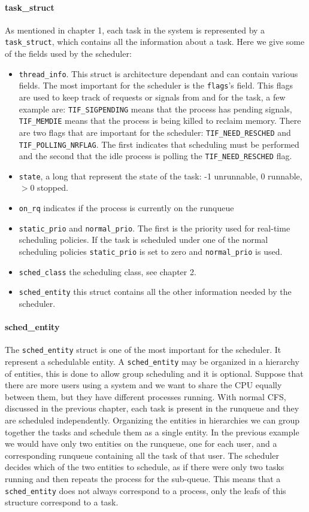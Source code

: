 \documentclass[10pt]{book}
\begin{document}
\paragraph{task\_struct}
As mentioned in chapter 1, each task in the system is represented by a \newline \verb|task_struct|, which contains all the information about a task. Here we give some of the fields used by the scheduler:
\begin{itemize}
    \item \verb|thread_info|. This struct is architecture dependant and can contain various fields. The most important for the scheduler is the \verb|flags|'s field. This flags are used to keep track of requests or signals from and for the task, a few example are: \verb|TIF_SIGPENDING| means that the process has pending signals, \verb|TIF_MEMDIE| means that the process is being killed to reclaim memory. There are two flags that are important for the scheduler: \verb|TIF_NEED_RESCHED| and \verb|TIF_POLLING_NRFLAG|. The first indicates that scheduling must be performed and the second that the idle process is polling the \verb|TIF_NEED_RESCHED| flag. %
    \item \verb|state|, a long that represent the state of the task: -1 unrunnable, 0 runnable, $>0$ stopped. 
    \item \verb|on_rq| indicates if the process is currently on the runqueue
    \item \verb|static_prio| and \verb|normal_prio|. The first is the priority used for real-time scheduling policies. If the task is scheduled under one of the normal scheduling policies \verb|static_prio| is set to zero and \verb|normal_prio| is used.
    \item \verb|sched_class| the scheduling class, see chapter 2.
    \item \verb|sched_entity| this struct contains all the other information needed by the scheduler.
\end{itemize}

\paragraph{sched\_entity}
The \verb|sched_entity| struct is one of the most important for the scheduler. It represent a schedulable entity.
A \verb|sched_entity| may be organized in a hierarchy of entities, this is done to allow group scheduling and it is optional. Suppose that there are more users using a system and we want to share the CPU equally between them, but they have different processes running. With normal CFS, discussed in the previous chapter, each task is present in the runqueue and they are scheduled independently. Organizing the entities in hierarchies we can group together the tasks and schedule them as a single entity. In the previous example we would have only two entities on the runqueue, one for each user, and a corresponding runqueue containing all the task of that user. The scheduler decides which of the two entities to schedule, as if there were only two tasks running and then repeats the process for the sub-queue. This means that a \verb|sched_entity| does not always correspond to a process, only the leafs of this structure correspond to a task. 
\end{document}
